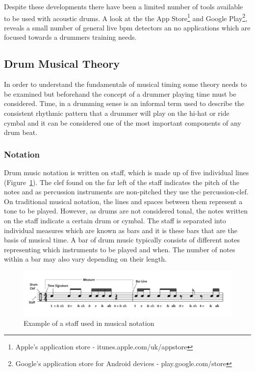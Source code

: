 \documentclass[a4paper, 11pt]{article}
\begin{document}
Despite these developments there have been a limited number of tools available to be used with acoustic drums. A look at the the App Store\footnote{Apple's application store - itunes.apple.com/uk/appstore‎} and Google Play\footnote{Google's application store for Android devices - play.google.com/store}, reveals a small number of general live bpm detectors an no applications which are focused towards a drummers training needs.\par

\subsection{Drum Musical Theory}
In order to understand the fundamentals of musical timing some theory needs to be examined but beforehand the concept of a drummer playing time must be considered. Time, in a drumming sense is an informal term used to describe the consistent rhythmic pattern that a drummer will play on the hi-hat or ride cymbal \cite{drum-bible} and it can be considered one of the most important components of any drum beat. 

\subsubsection{Notation}
Drum music notation is written on staff, which is made up of five individual lines (Figure~\ref{fig: staff}). The clef found on the far left of the staff indicates the pitch of the notes \cite{oxford-comp} and as percussion instruments are non-pitched they use the percussion-clef. On traditional musical notation, the lines and spaces between them represent a tone to be played. However, as drums are not considered tonal, the notes written on the staff indicate a certain drum or cymbal. The staff is separated into individual measures which are known as bars \cite{drum-note} and it is these bars that are the basis of musical time. A bar of drum music typically consists of different notes representing which instruments to be played and when. The number of notes within a bar may also vary depending on their length. 

\begin{figure}
	\centering
	\includegraphics[scale=0.3]{images/staff.jpg}
	\caption{Example of a staff used in musical notation}
	\label{fig: staff}
\end{figure}
\end{document}
